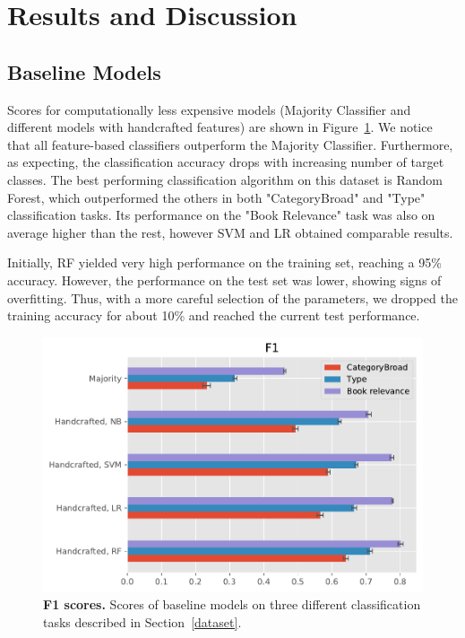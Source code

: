 \documentclass[11pt,a4paper]{article}
\begin{document}
\section{Results and Discussion}
\subsection{Baseline Models}
Scores for computationally less expensive models (Majority Classifier and different models with handcrafted features) are shown in Figure~\ref{fig:acc_res}. We notice that all feature-based classifiers outperform the Majority Classifier. Furthermore, as expecting, the classification accuracy drops with increasing number of target classes. The best performing classification algorithm on this dataset is Random Forest, which outperformed the others in both "CategoryBroad" and "Type" classification tasks. Its performance on the "Book Relevance" task was also on average higher than the rest, however SVM and LR obtained comparable results.

Initially, RF yielded very high performance on the training set, reaching a 95\% accuracy. However, the performance on the test set was lower, showing signs of overfitting. Thus, with a more careful selection of the parameters, we dropped the training accuracy for about 10\% and reached the current test performance.

\begin{figure}[tbh]
    \centering
    \includegraphics[width = \linewidth]{../results/plot_baselines.pdf}
    \caption{\textbf{F1 scores.} Scores of baseline models on three different classification tasks described in Section~\ref{dataset}.}
    \label{fig:acc_res}
\end{figure}
\end{document}
